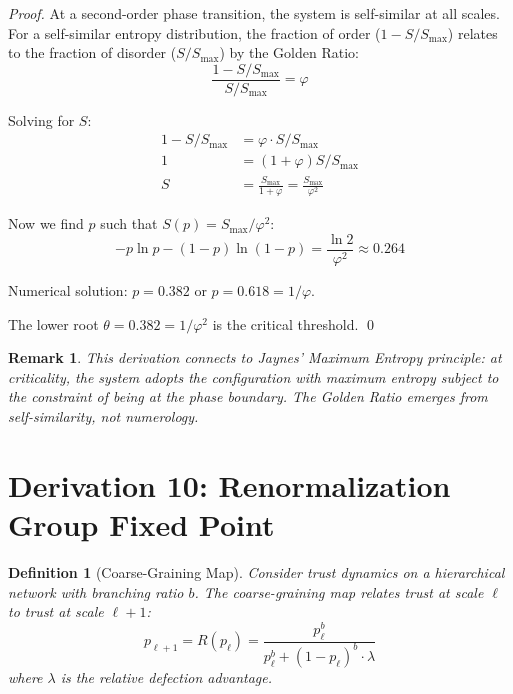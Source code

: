 \documentclass[11pt]{article}
\newtheorem{definition}[theorem]{Definition}
\newtheorem{remark}[theorem]{Remark}
\begin{document}
\begin{proof}
At a second-order phase transition, the system is self-similar at all scales. For a self-similar entropy distribution, the fraction of order ($1-S/S_{\max}$) relates to the fraction of disorder ($S/S_{\max}$) by the Golden Ratio:
\begin{equation}
\frac{1 - S/S_{\max}}{S/S_{\max}} = \varphi
\end{equation}

Solving for $S$:
\begin{align}
1 - S/S_{\max} &= \varphi \cdot S/S_{\max} \\
1 &= (1 + \varphi) S/S_{\max} \\
S &= \frac{S_{\max}}{1 + \varphi} = \frac{S_{\max}}{\varphi^2}
\end{align}

Now we find $p$ such that $S(p) = S_{\max}/\varphi^2$:
\begin{equation}
-p \ln p - (1-p) \ln(1-p) = \frac{\ln 2}{\varphi^2} \approx 0.264
\end{equation}

Numerical solution: $p = 0.382$ or $p = 0.618 = 1/\varphi$.

The lower root $\theta = 0.382 = 1/\varphi^2$ is the critical threshold. \qed
\end{proof}

\begin{remark}
This derivation connects to Jaynes' Maximum Entropy principle: at criticality, the system adopts the configuration with maximum entropy subject to the constraint of being at the phase boundary. The Golden Ratio emerges from self-similarity, not numerology.
\end{remark}

\section{Derivation 10: Renormalization Group Fixed Point}
\label{sec:rg}

\begin{definition}[Coarse-Graining Map]
Consider trust dynamics on a hierarchical network with branching ratio $b$. The coarse-graining map relates trust at scale $\ell$ to trust at scale $\ell+1$:
\begin{equation}
p_{\ell+1} = R(p_\ell) = \frac{p_\ell^b}{p_\ell^b + (1 - p_\ell)^b \cdot \lambda}
\end{equation}
where $\lambda$ is the relative defection advantage.
\end{definition}
\end{document}
